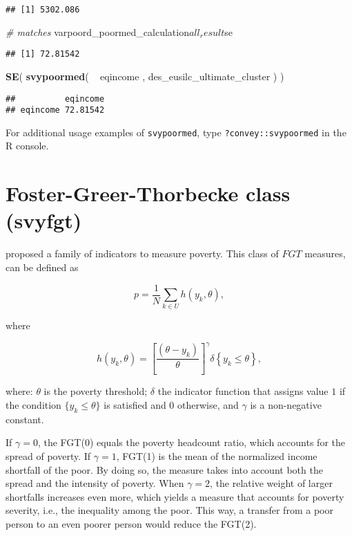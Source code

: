 \documentclass[]{book}
\newenvironment{Shaded}{\begin{snugshade}}{\end{snugshade}}
\newcommand{\KeywordTok}[1]{\textcolor[rgb]{0.13,0.29,0.53}{\textbf{{#1}}}}
\newcommand{\StringTok}[1]{\textcolor[rgb]{0.31,0.60,0.02}{{#1}}}
\newcommand{\CommentTok}[1]{\textcolor[rgb]{0.56,0.35,0.01}{\textit{{#1}}}}
\newcommand{\NormalTok}[1]{{#1}}
\begin{document}
\begin{verbatim}
## [1] 5302.086
\end{verbatim}

\begin{Shaded}
\begin{Highlighting}[]
\CommentTok{# matches}
\NormalTok{varpoord_poormed_calculation$all_result$se}
\end{Highlighting}
\end{Shaded}

\begin{verbatim}
## [1] 72.81542
\end{verbatim}

\begin{Shaded}
\begin{Highlighting}[]
\KeywordTok{SE}\NormalTok{( }\KeywordTok{svypoormed}\NormalTok{( ~}\StringTok{ }\NormalTok{eqincome , des_eusilc_ultimate_cluster ) )}
\end{Highlighting}
\end{Shaded}

\begin{verbatim}
##          eqincome
## eqincome 72.81542
\end{verbatim}

For additional usage examples of \texttt{svypoormed}, type
\texttt{?convey::svypoormed} in the R console.

\section{Foster-Greer-Thorbecke class
(svyfgt)}\label{foster-greer-thorbecke-class-svyfgt}

\citet{foster1984} proposed a family of indicators to measure poverty.
This class of \(FGT\) measures, can be defined as

\[
p=\frac{1}{N}\sum_{k\in U}h(y_{k},\theta ), 
\]

where

\[
h(y_{k},\theta )=\left[ \frac{(\theta -y_{k})}{\theta }\right] ^{\gamma
}\delta \left\{ y_{k}\leq \theta \right\} , 
\]

where: \(\theta\) is the poverty threshold; \(\delta\) the indicator
function that assigns value \(1\) if the condition
\(\{y_{k}\leq \theta \}\) is satisfied and \(0\) otherwise, and
\(\gamma\) is a non-negative constant.

If \(\gamma =0\), the FGT(0) equals the poverty headcount ratio, which
accounts for the spread of poverty. If \(\gamma =1\), FGT(1) is the mean
of the normalized income shortfall of the poor. By doing so, the measure
takes into account both the spread and the intensity of poverty. When
\(\gamma =2\), the relative weight of larger shortfalls increases even
more, which yields a measure that accounts for poverty severity, i.e.,
the inequality among the poor. This way, a transfer from a poor person
to an even poorer person would reduce the FGT(2).
\end{document}
